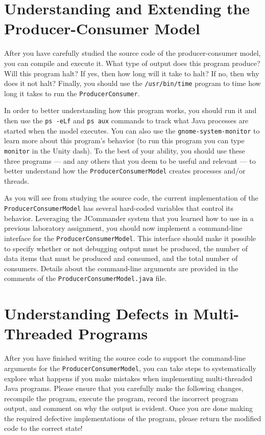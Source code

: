 \section*{Understanding and Extending the Producer-Consumer Model}

After you have carefully studied the source code of the producer-consumer model, you can compile and execute it.  What type of
output does this program produce?  Will this program halt?  If yes, then how long will it take to halt?  If no, then why does it
not halt? Finally, you should use the {\tt /usr/bin/time} program to time how long it takes to run the {\tt ProducerConsumer}.

In order to better understanding how this program works, you should run it and then use the {\tt ps -eLf} and {\tt ps aux}
commands to track what Java processes are started when the model executes. You can also use the {\tt gnome-system-monitor} to
learn more about this program's behavior (to run this program you can type {\tt monitor} in the Unity dash).  To the best of your
ability, you should use these three programs --- and any others that you deem to be useful and relevant --- to better understand
how the {\tt ProducerConsumerModel} creates processes and/or threads.

\begin{sloppypar}
  As you will see from studying the source code, the current implementation of the {\tt ProducerConsumerModel} has several
  hard-coded variables that control its behavior. Leveraging the JCommander system that you learned how to use in a previous
  laboratory assignment, you should now implement a command-line interface for the {\tt ProducerConsumerModel}.  This interface
  should make it possible to specify whether or not debugging output must be produced, the number of data items that must be
  produced and consumed, and the total number of consumers.  Details about the command-line arguments are provided in the comments
  of the {\tt ProducerConsumerModel.java} file. 
\end{sloppypar}

\section*{Understanding Defects in Multi-Threaded Programs}

  After you have finished writing the source code to support the command-line arguments for the {\tt ProducerConsumerModel}, you
  can take steps to systematically explore what happens if you make mistakes when implementing multi-threaded Java programs.
  Please ensure that you carefully make the following changes, recompile the program, execute the program, record the incorrect
  program output, and comment on why the output is evident.  Once you are done making the required defective implementations of
  the program, please return the modified code to the correct state!

